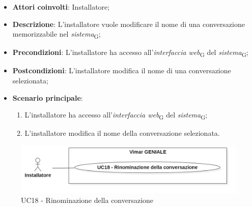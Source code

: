 \begin{itemize}
    \item \textbf{Attori coinvolti}: Installatore;
    \item \textbf{Descrizione}: L'installatore vuole modificare il nome di una conversazione memorizzabile nel \textit{sistema}\textsubscript{G};
    \item \textbf{Precondizioni}: L’installatore ha accesso all’\textit{interfaccia web}\textsubscript{G} del \textit{sistema}\textsubscript{G};
    \item \textbf{Postcondizioni}: L'installatore modifica il nome di una conversazione selezionata;
    \item \textbf{Scenario principale}:
    \begin{enumerate}
        \item L’installatore ha accesso all’\textit{interfaccia web}\textsubscript{G} del \textit{sistema}\textsubscript{G};
        \item L'installatore modifica il nome della conversazione selezionata.
    \end{enumerate}
\end{itemize}
\begin{figure}[H]
\centering
\includegraphics[width=1\textwidth]{contents/casi_duso/png/UC18.png}
\caption{UC18 - Rinominazione della conversazione}
\end{figure}